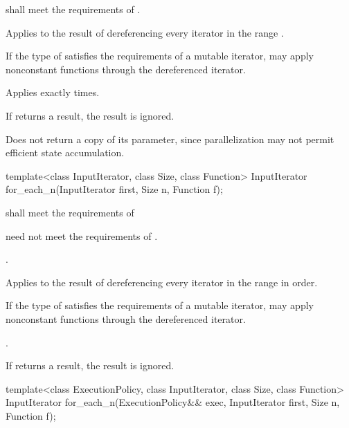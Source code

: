 \begin{itemdescr}
\pnum
\requires
{} shall meet the requirements of .

\pnum
\effects
Applies  to the result of dereferencing every iterator in the range
.
\begin{note}
If the type of  satisfies the requirements of a mutable iterator,
 may apply nonconstant functions through the dereferenced iterator.
\end{note}

\pnum
\complexity
Applies  exactly  times.

\pnum
\remarks
If  returns a result, the result is ignored.

\pnum
\realnotes Does not return a copy of its  parameter, since
parallelization may not permit efficient state accumulation.
\end{itemdescr}

%
\begin{itemdecl}
template<class InputIterator, class Size, class Function>
  InputIterator for_each_n(InputIterator first, Size n, Function f);
\end{itemdecl}

\begin{itemdescr}
\pnum
\requires
{} shall meet the requirements of 
\begin{note}  need not meet the requirements of
. \end{note}

\pnum
\requires
{}.

\pnum
\effects
Applies  to the result of dereferencing every iterator in the range
 in order.
\begin{note}
If the type of  satisfies the requirements of a mutable iterator,
 may apply nonconstant functions through the dereferenced iterator.
\end{note}

\pnum
\returns
{}.

\pnum
\remarks
If  returns a result, the result is ignored.
\end{itemdescr}

%
\begin{itemdecl}
template<class ExecutionPolicy, class InputIterator, class Size, class Function>
  InputIterator for_each_n(ExecutionPolicy&& exec, InputIterator first, Size n,
                           Function f);
\end{itemdecl}

